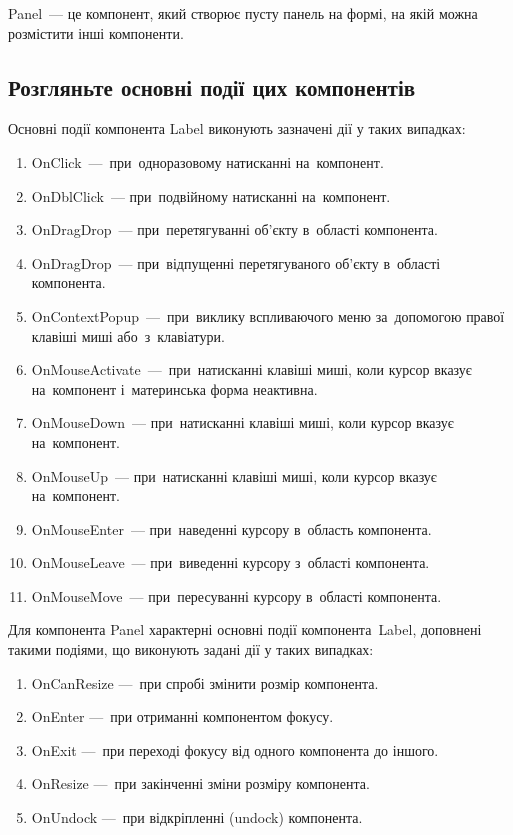 \documentclass[
	a4paper,
	oneside,
	BCOR = 10mm,
	DIV = 12,
	12pt,
	headings = normal,
]{scrartcl}
\begin{document}
			\textenglish{Panel}~— це компонент, який створює пусту панель на формі, на якій можна розмістити інші компоненти. 

		\subsection{Розгляньте основні події цих компонентів}
			Основні події компонента \textenglish{Label} виконують зазначені дії у таких випадках:
			\begin{enumerate}[noitemsep]
				\item \textenglish{OnClick}~— при~одноразовому натисканні на~компонент.
				\item \textenglish{OnDblClick}~— при~подвійному натисканні на~компонент.
				\item \textenglish{OnDragDrop}~— при~перетягуванні об'єкту в~області компонента.
				\item \textenglish{OnDragDrop}~— при~відпущенні перетягуваного об'єкту в~області компонента.
				\item \textenglish{OnContextPopup}~— при~виклику вспливаючого меню за~допомогою правої клавіші миші або~з~клавіатури.
				\item \textenglish{OnMouseActivate}~— при~натисканні клавіші миші, коли курсор вказує на~компонент і~материнська форма неактивна.
				\item \textenglish{OnMouseDown}~— при~натисканні клавіші миші, коли курсор вказує на~компонент.
				\item \textenglish{OnMouseUp}~— при~натисканні клавіші миші, коли курсор вказує на~компонент.
				\item \textenglish{OnMouseEnter}~— при~наведенні курсору в~область компонента.
				\item \textenglish{OnMouseLeave}~— при~виведенні курсору з~області компонента.
				\item \textenglish{OnMouseMove}~— при~пересуванні курсору в~області компонента.
			\end{enumerate}

			Для компонента \textenglish{Panel} характерні основні події компонента~\textenglish{Label}, доповнені такими подіями, що виконують задані дії у таких випадках:
			\begin{enumerate}[noitemsep]
				\item \textenglish{OnCanResize} — при спробі змінити розмір компонента.
				\item \textenglish{OnEnter} — при отриманні компонентом фокусу.
				\item \textenglish{OnExit} — при переході фокусу від одного компонента до іншого.
				\item \textenglish{OnResize} — при закінченні зміни розміру компонента.
				\item \textenglish{OnUndock} — при відкріпленні (\textenglish{undock}) компонента.
			\end{enumerate}
\end{document}
